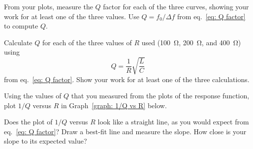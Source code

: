 \documentclass[addpoints]{physlabs}
\begin{document}
\begin{postlab}
\begin{solution}[3cm]
    \end{solution}

    \filbreak
    \question[1] From your plots, measure the $Q$ factor for each of the three curves, showing your work for at least one of the three values. Use $Q=f_0/\Delta f$ from eq.~\ref{eq: Q factor} to compute $Q$.
    \begin{solution}[3cm]
        
    \end{solution}

    \filbreak
    \question[1] Calculate $Q$ for each of the three values of $R$ used (\qty{100}{\ohm}, \qty{200}{\ohm}, and \qty{400}{\ohm}) using
    \[
        Q = \frac{1}{R}\sqrt{\frac{L}{C}}
    \]
    from eq.~\ref{eq: Q factor}. Show your work for at least one of the three calculations.
    \begin{solution}[6cm]
        
    \end{solution}

    \filbreak
    \question[2] Using the values of $Q$ that you measured from the plots of the response function, plot $1/Q$ versus $R$ in Graph~\ref{graph: 1/Q vs R} below.

    \begin{center}
    \captionsetup{font=normalsize}
    \end{center}

    Does the plot of $1/Q$ versus $R$ look like a straight line, as you would expect from eq.~\ref{eq: Q factor}? Draw a best-fit line and measure the slope. How close is your slope to its expected value?
    

\end{postlab}
\end{document}
